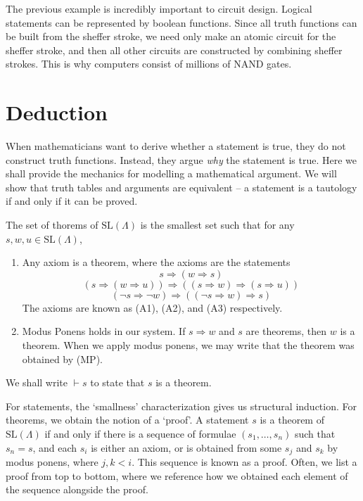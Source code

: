 The previous example is incredibly important to circuit design. Logical statements can be represented by boolean functions. Since all truth functions can be built from the sheffer stroke, we need only make an atomic circuit for the sheffer stroke, and then all other circuits are constructed by combining sheffer strokes. This is why computers consist of millions of NAND gates.




\section{Deduction}

When mathematicians want to derive whether a statement is true, they do not construct truth functions. Instead, they argue {\it why} the statement is true. Here we shall provide the mechanics for modelling a mathematical argument. We will show that truth tables and arguments are equivalent -- a statement is a tautology if and only if it can be proved.

\begin{definition}
    The set of thorems of $\text{SL}(\Lambda)$ is the smallest set such that for any $s,w,u \in \text{SL}(\Lambda)$,
    \begin{enumerate}
        \item Any axiom is a theorem, where the axioms are the statements
        \[ s \Rightarrow (w \Rightarrow s) \]
        \[ (s \Rightarrow (w \Rightarrow u)) \Rightarrow ((s \Rightarrow w) \Rightarrow (s \Rightarrow u)) \]
        \[ (\neg s \Rightarrow \neg w) \Rightarrow ((\neg s \Rightarrow w) \Rightarrow s) \]
        The axioms are known as (A1), (A2), and (A3) respectively.
        \item Modus Ponens holds in our system. If $s \Rightarrow w$ and $s$ are theorems, then $w$ is a theorem. When we apply modus ponens, we may write that the theorem was obtained by (MP).
    \end{enumerate}
    We shall write $\vdash s$ to state that $s$ is a theorem.
\end{definition}

For statements, the `smallness' characterization gives us structural induction. For theorems, we obtain the notion of a `proof'. A statement $s$ is a theorem of $\text{SL}(\Lambda)$ if and only if there is a sequence of formulae $(s_1, \dots, s_n)$ such that $s_n = s$, and each $s_i$ is either an axiom, or is obtained from some $s_j$ and $s_k$ by modus ponens, where $j,k < i$. This sequence is known as a proof. Often, we list a proof from top to bottom, where we reference how we obtained each element of the sequence alongside the proof.

